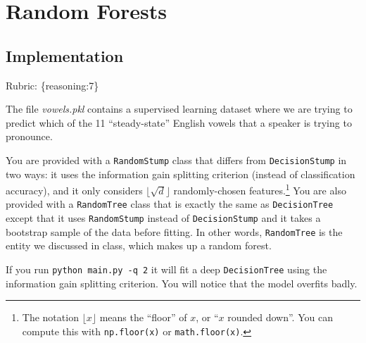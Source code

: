 \documentclass{article}
\def\gre#1{{\color{gre}#1}}
\def\rubric#1{\gre{Rubric: \{#1\}}}{}
\begin{document}
\section{Random Forests}

\subsection{Implementation}
\rubric{reasoning:7}

The file \emph{vowels.pkl} contains a supervised learning dataset where we are trying to predict which of the 11 ``steady-state'' English vowels that a speaker is trying to pronounce.

You are provided with a \texttt{RandomStump} class that differs from
\texttt{DecisionStump} in two ways: it uses the information gain splitting criterion
(instead of classification accuracy), and
it only considers $\lfloor \sqrt{d} \rfloor$ randomly-chosen features.\footnote{The notation $\lfloor x\rfloor$ means the ``floor'' of $x$, or ``$x$ rounded down''. You can compute this with \texttt{np.floor(x)} or \texttt{math.floor(x)}.}
You are also provided with a \texttt{RandomTree} class that is exactly the same as
\texttt{DecisionTree} except that it uses \texttt{RandomStump} instead of
\texttt{DecisionStump} and it takes a bootstrap sample of the data before fitting.
In other words, \texttt{RandomTree} is the entity we discussed in class, which
makes up a random forest.

If you run \texttt{python main.py -q 2} it will fit a deep \texttt{DecisionTree}
using the information gain splitting criterion. You will notice that the model overfits badly.
\end{document}
